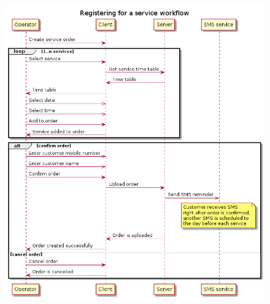 \documentclass{article}
\begin{document}
    \begin{figure}[H]
        \centering
        \includegraphics[width=0.9\linewidth]{PSP/lab-1/diagrams/sequence/service-order.png}
        \caption{}
        \label{}
    \end{figure}
    
\end{document}
